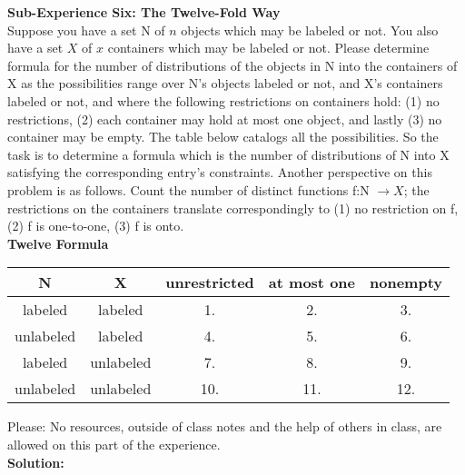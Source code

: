 \documentclass[10pt,a4paper]{report}
\begin{document}
	\textbf{Sub-Experience Six: The Twelve-Fold Way}\\
	Suppose you have a set N of $n$ objects which may be labeled or not.  You also have a set $X$ of $x$ containers which may be labeled or not.  Please determine formula for the number of distributions of the objects in N into the containers of X as the possibilities range over N's objects labeled or not, and X's containers labeled or not, and where the following restrictions on containers hold:  (1) no restrictions,  (2) each container may hold at most one object, and lastly (3) no container may be empty.  The table below catalogs all the possibilities.  So the task is to determine a formula which is the number of distributions of N into X satisfying the corresponding entry's constraints.  Another perspective on this problem is as follows.  Count the number of distinct functions f:N $\rightarrow X$; the restrictions on the containers translate correspondingly to (1) no restriction on f, (2) f is one-to-one, (3) f is onto.\\
	\newline
	\textbf{Twelve Formula}\\
	\begin{center}
		\begin{tabular}{c|c||c|c|c}
			\hline
			N&X&unrestricted&at most one&nonempty\\
			\hline
			labeled&labeled&1.&2.&3.\\
			unlabeled&labeled&4.&5.&6.\\
			labeled&unlabeled&7.&8.&9.\\
			unlabeled&unlabeled&10.&11.&12.\\
			\hline
			\end{tabular}
	\end{center}
	Please: No resources, outside of class notes and the help of others in class, are allowed on this part of the experience.\\
	\newline
	\textbf{Solution: }
\end{document}
